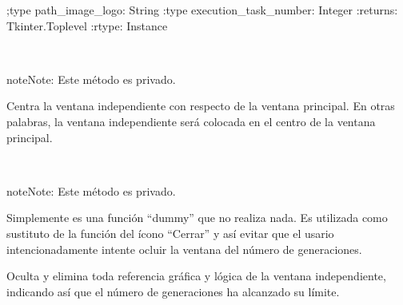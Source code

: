 \documentclass[letterpaper,10pt,english]{sphinxmanual}
\begin{document}
\begin{fulllineitems}
\begin{quote}
\begin{description}
\begin{itemize}
\end{itemize}

\end{description}\end{quote}

;type path\_image\_logo: String
:type execution\_task\_number: Integer
:returns: Tkinter.Toplevel
:rtype: Instance

\begin{fulllineitems}
\label{View/Additional/GenerationSignal/GenerationSignal:View.Additional.GenerationSignal.GenerationSignalToplevel.GenerationSignalToplevel._GenerationSignalToplevel__center}~
\begin{notice}{note}{Note:}
Este método es privado.
\end{notice}

Centra la ventana independiente con respecto de la ventana principal.
En otras palabras, la ventana independiente será colocada en el centro de la 
ventana principal.

\end{fulllineitems}


\begin{fulllineitems}
\label{View/Additional/GenerationSignal/GenerationSignal:View.Additional.GenerationSignal.GenerationSignalToplevel.GenerationSignalToplevel._GenerationSignalToplevel__do_nothing}~
\begin{notice}{note}{Note:}
Este método es privado.
\end{notice}

Simplemente es una función ``dummy'' que no realiza nada. 
Es utilizada como sustituto de la función del ícono ``Cerrar'' y así evitar
que el usario intencionadamente intente ocluir la ventana del número de generaciones.

\end{fulllineitems}


\begin{fulllineitems}
\label{View/Additional/GenerationSignal/GenerationSignal:View.Additional.GenerationSignal.GenerationSignalToplevel.GenerationSignalToplevel.close}
Oculta y elimina toda referencia gráfica y lógica de la 
ventana independiente, indicando así que el número de generaciones ha alcanzado
su límite.


\end{fulllineitems}
\end{fulllineitems}
\end{document}
